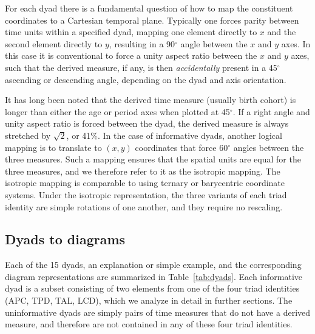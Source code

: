 \documentclass[12pt,oneside,a4paper]{article} %
\begin{document}
For each dyad there is a fundamental question of how to map the constituent
coordinates to a Cartesian temporal plane. Typically one forces parity between time units within
a specified dyad, mapping one element directly to $x$ and the second element
directly to $y$, resulting in a 90$^\circ$ angle between the $x$ and $y$
axes. In this case it is conventional to force a unity aspect ratio
between the $x$ and $y$ axes, such that the derived measure, if any, is then
\textit{accidentally} present in a 45$^\circ$ ascending or descending angle,
depending on the dyad and axis orientation. 

It has long been noted \citep{perozzo1880della, zeuner1869abhandlungen} that the
derived time measure (usually birth cohort) is longer than either the age or period axes when plotted at 45$^\circ$.
If a right angle and unity aspect ratio is forced between the dyad, the derived measure is always stretched by
$\sqrt{2}$, or 41\%. In the case of informative dyads, another
logical mapping is to translate to $(x,y)$ coordinates that force 60$^\circ$
angles between the three measures. Such a mapping ensures that the spatial units are equal for the three measures, and we therefore refer to it as the isotropic mapping. The isotropic mapping
is comparable to using ternary or barycentric coordinate systems. 
Under the isotropic representation, the three variants of each triad identity
are simple rotations of one another, and they require no rescaling.

\subsection{Dyads to diagrams}
Each of the 15 dyads, an explanation or simple example,
and the corresponding diagram representations are summarized in
Table~\ref{tab:dyads}. Each informative dyad is a subset consisting of two
elements from one of the four triad identities (APC, TPD, TAL, LCD), which we
analyze in detail in further sections. The uninformative dyads are simply pairs
of time measures that do not have a derived measure, and therefore are not
contained in any of these four triad identities.
\pagebreak
\end{document}
